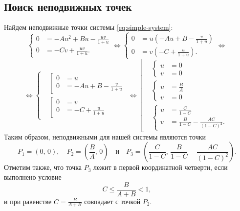 \documentclass[a4paper, 11pt]{article}
\begin{document}
	\subsection{Поиск неподвижных точек}
	Найдем неподвижные точки системы \eqref{eq:simple-system}:
	$$
		\left\{\begin{aligned}
		0 &= -A u^2 + Bu - \frac{uv}{1 + u}\\
		0 &= -C v + \frac{uv}{1 + u}.
		\end{aligned}\right.
		\Longleftrightarrow
		\left\{\begin{aligned}
		0 &= u\left(-A u + B - \frac{v}{1 + u}\right)\\
		0 &= v\left(-C + \frac{u}{1 + u}\right).
		\end{aligned}\right.
		\Longleftrightarrow
	$$
	$$
		\Longleftrightarrow
		\left\{\begin{aligned}
		&\left[\begin{aligned}
			0 &= u \\
			0 &= -Au + B -\frac{v}{1 + u}
		\end{aligned}\right.
		\\
		&\left[\begin{aligned}
			0 &= v \\
			0 &= -C + \frac{u}{1 + u}
		\end{aligned}\right.
		\end{aligned}\right.
		\Longleftrightarrow
		\left[\begin{aligned}
		&\left\{\begin{aligned}
			u &= 0 \\
			v &=0
		\end{aligned}\right.
		\\
		&\left\{\begin{aligned}
			u &= \frac{B}{A} \\
			v &= 0
		\end{aligned}\right.
		\\
		&\left\{\begin{aligned}
			u &= \frac{C}{1 - C} \\
			v &= \frac{B}{1-C} - \frac{AC}{(1 - C)^2}.
		\end{aligned}\right.
		\end{aligned}\right.
	$$
	Таким образом, неподвижными для нашей системы являются точки
	$$
		P_1 = (0,\,0),
		\quad
		P_2 = \left(\frac{B}{A},\,0\right)
		\quad \mbox{и} \quad 
		P_3 = \left(\frac{C}{1 - C},\, \frac{B}{1 - C} - \frac{AC}{(1 - C)^2}\right).
	$$
	Отметим также, что точка $P_3$ лежит в первой координатной четверти, если выполнено условие
	\begin{equation}
		C \leqslant \frac{B}{A + B} < 1,
	\end{equation}
        и при равенстве $C = \frac{B}{A+B}$ совпадает с точкой $P_2$.
\end{document}
